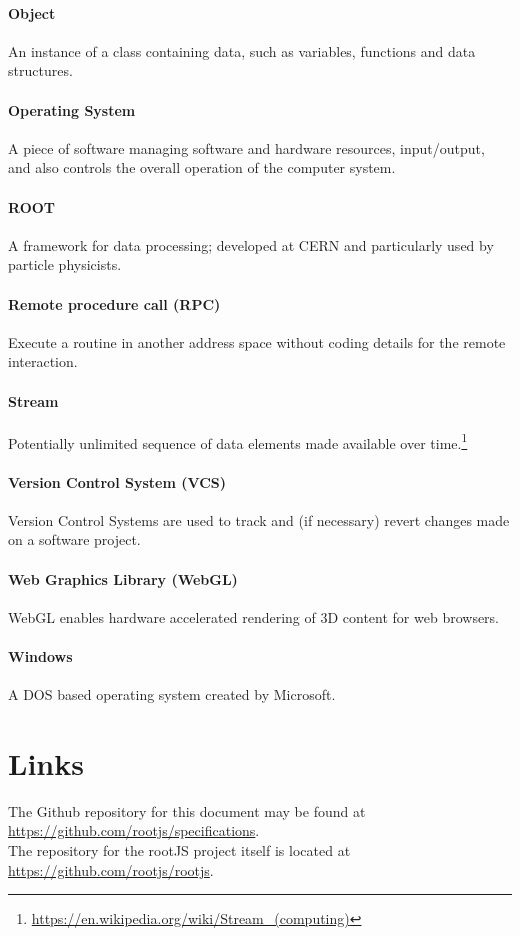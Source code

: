 \paragraph{Object}
An instance of a class containing data, such as variables, functions and data structures.

\paragraph{Operating System}
A piece of software managing software and hardware resources, input/output, and also controls the overall operation of the computer system.

\paragraph{ROOT}
A framework for data processing; developed at CERN and particularly used by particle physicists.

\paragraph{Remote procedure call (RPC)}
Execute a routine in another address space without coding details for the remote interaction.

\paragraph{Stream}
Potentially unlimited sequence of data elements made available over time.\footnote{\url{https://en.wikipedia.org/wiki/Stream_(computing)}}

\paragraph{Version Control System (VCS)}
Version Control Systems are used to track and (if necessary) revert changes made on a software project.

\paragraph{Web Graphics Library (WebGL)}
WebGL enables hardware accelerated rendering of 3D content for web browsers.

\paragraph{Windows}
A DOS based operating system created by Microsoft.

\pagebreak[4]

\section{Links}

The Github repository for this document may be found at \url{https://github.com/rootjs/specifications}. \\
The repository for the rootJS project itself is located at \url{https://github.com/rootjs/rootjs}.
